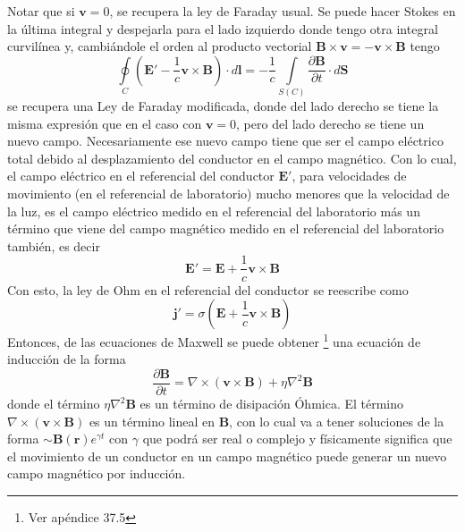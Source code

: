 Notar que si $\textbf{v} = 0$, se recupera la ley de Faraday usual. Se puede hacer Stokes en la última integral y despejarla para el lado izquierdo donde tengo otra integral curvilínea y, cambiándole el orden al producto vectorial $\textbf{B} \times \textbf{v} = - \textbf{v} \times \textbf{B}$ tengo
\begin{equation*}
    \oint\limits_{C}
    \left(
        \textbf{E}' - \frac{1}{c}\textbf{v} \times \textbf{B}
    \right)
    \cdot d\textbf{l}
    = 
    -\frac{1}{c}\int\limits_{S(C)}\frac{\partial \textbf{B}}{\partial t}\cdot d\textbf{S}
\end{equation*}
se recupera una Ley de Faraday modificada, donde del lado derecho se tiene la misma expresión que en el caso con $\textbf{v} = 0$, pero del lado derecho se tiene un nuevo campo. Necesariamente ese nuevo campo tiene que ser el campo eléctrico total debido al desplazamiento del conductor en el campo magnético. Con lo cual, el campo eléctrico en el referencial del conductor $\textbf{E}'$, para velocidades de movimiento (en el referencial de laboratorio) mucho menores que la velocidad de la luz, es el campo eléctrico medido en el referencial del laboratorio más un término que viene del campo magnético medido en el referencial del laboratorio también, es decir
\begin{equation*}
    \textbf{E}' = \textbf{E} + \frac{1}{c}
    \textbf{v}\times \textbf{B}
\end{equation*}
Con esto, la ley de Ohm en el referencial del conductor se reescribe como
\begin{equation*}
    \textbf{j}' = \sigma
    \left(
        \textbf{E} + \frac{1}{c}
        \textbf{v}\times \textbf{B}
    \right)
\end{equation*}
Entonces, de las ecuaciones de Maxwell se puede obtener \footnote{Ver apéndice 37.5} una ecuación de inducción de la forma
\begin{equation*}
    \frac{\partial \textbf{B}}{\partial t} 
    = \nabla \times 
    \left(
        \textbf{v}\times \textbf{B}
    \right)
    +
    \eta \nabla^{2}\textbf{B}
\end{equation*}
donde el término $\eta \nabla^{2}\textbf{B}$ es un término de disipación Óhmica. El término $\nabla \times (\textbf{v} \times \textbf{B})$ es un término lineal en $\textbf{B}$, con lo cual va a tener soluciones de la forma $\sim \textbf{B}(\textbf{r})e^{\gamma t}$ con $\gamma$ que podrá ser real o complejo y físicamente significa que el movimiento de un conductor en un campo magnético puede generar un nuevo campo magnético por inducción.


